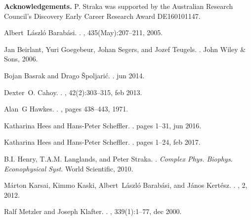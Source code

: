 \documentclass[12pt]{article}
\newcommand{\1}{\mathbf 1}
\begin{document}
{\bf Acknowledgements.} P. Straka was supported by the Australian Research Council’s Discovery Early Career Research Award DE160101147.


%
%

\begin{thebibliography}{KKBK12}

Albert~L{\'{a}}szl{\'{o}} Barab{\'{a}}si.
.
, 435(May):207--211, 2005.

Jan Beirlant, Yuri Goegebeur, Johan Segers, and Jozef Teugels.
.
\newblock John Wiley \& Sons, 2006.

Bojan Basrak and Drago {\v{S}}poljari{\'{c}}.
.
\newblock jun 2014.

Dexter~O. Cahoy.
.
, 42(2):303--315, feb 2013.

Alan~G Hawkes.
.
, pages 438--443, 1971.

Katharina Hees and Hans-Peter Scheffler.
.
\newblock pages 1--31, jun 2016.

Katharina Hees and Hans-Peter Scheffler.
.
\newblock pages 1--24, feb 2017.

B.I. Henry, {T.A.M. Langlands}, and Peter Straka.
.
{\em Complex Phys. Biophys.
  Econophysical Syst.} World Scientific, 2010.

M{\'{a}}rton Karsai, Kimmo Kaski, Albert~L{\'{a}}szl{\'{o}} Barab{\'{a}}si, and
  J{\'{a}}nos Kert{\'{e}}sz.
.
, 2, 2012.

Ralf Metzler and Joseph Klafter.
.
, 339(1):1--77, dec 2000.


\end{thebibliography}
\end{document}
